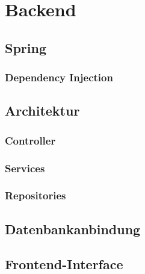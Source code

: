 \section{Backend}

\subsection{Spring}

\subsubsection{Dependency Injection}

\subsection{Architektur}

\subsubsection{Controller}

\subsubsection{Services}

\subsubsection{Repositories}

\subsection{Datenbankanbindung}

\subsection{Frontend-Interface}